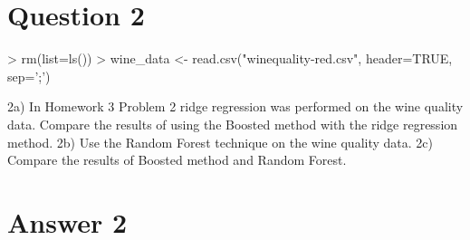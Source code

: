 \documentclass{article}
\begin{document}
\section*{Question 2}

\begin{Schunk}
\begin{Sinput}
> rm(list=ls())
> wine_data <- read.csv("winequality-red.csv", header=TRUE, sep=';')
\end{Sinput}
\end{Schunk}

2a) In Homework 3 Problem 2 ridge regression was performed on the wine
quality data. Compare the results of using the Boosted method with the
ridge regression method.
2b) Use the Random Forest technique on the wine quality data.
2c) Compare the results of Boosted method and Random Forest.

\section*{Answer  2}
\end{document}

